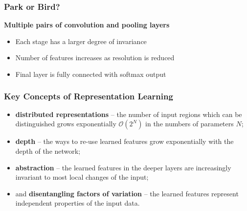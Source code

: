 \begin{frame}
  \frametitle{Park or Bird?}
    \begin{center}

        \textbf{Multiple pairs of convolution and pooling layers}
        \begin{itemize}
          \item Each stage has a larger degree of invariance
          \item Number of features increases as resolution is reduced
          \item Final layer is fully connected with softmax output
        \end{itemize}

    \end{center}
\end{frame}

\begin{frame}
\frametitle{Key Concepts of Representation Learning}

\begin{itemize}
\item \textbf{distributed representations} -- the number of input regions which can be distinguished grows exponentially $\mathcal{O}(2^N)$ in the numbers of parameters $N$; 
\item \textbf{depth} -- the ways to re-use learned features grow exponentially with the depth of the network;
\item \textbf{abstraction} -- the learned features in the deeper layers are increasingly invariant to most local changes of the input;
\item and \textbf{disentangling factors of variation} -- the learned features represent independent properties of the input data.
\end{itemize}

\end{frame}

